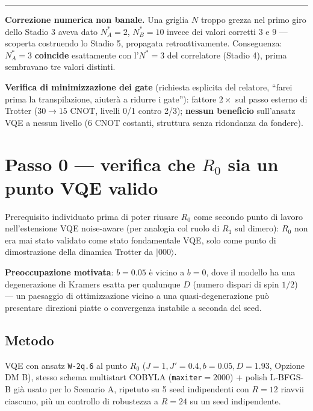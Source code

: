 \documentclass[11pt,a4paper]{article}
\begin{document}
\begin{center}
\begin{minipage}{0.93\textwidth}
\small\textcolor{arancio}{\rule{2.2em}{1.1pt}}\enspace
\textcolor{arancio}{\textbf{Correzione numerica non banale.}}\enspace
Una griglia $N$ troppo grezza nel primo giro dello Stadio 3 aveva dato
$N^*_A=2$, $N^*_B=10$ invece dei valori corretti $3$ e $9$ --- scoperta
costruendo lo Stadio 5, propagata retroattivamente. Conseguenza: $N^*_A=3$
\textbf{coincide} esattamente con l'$N^*=3$ del correlatore (Stadio 4), prima
sembravano tre valori distinti.
\end{minipage}
\end{center}
\medskip

\textbf{Verifica di minimizzazione dei gate} (richiesta esplicita del
relatore, ``farei prima la transpilazione, aiuterà a ridurre i gate''):
fattore $2\times$ sul passo esterno di Trotter ($30\to15$ CNOT, livelli 0/1
contro 2/3); \textbf{nessun beneficio} sull'ansatz VQE a nessun livello (6
CNOT costanti, struttura senza ridondanza da fondere).

\section{Passo 0 --- verifica che $R_0$ sia un punto VQE valido}

Prerequisito individuato prima di poter riusare $R_0$ come secondo punto di
lavoro nell'estensione VQE noise-aware (per analogia col ruolo di $R_1$ sul
dimero): $R_0$ non era mai stato validato come stato fondamentale VQE, solo
come punto di dimostrazione della dinamica Trotter da $|000\rangle$.

\textbf{Preoccupazione motivata}: $b=0.05$ è vicino a $b=0$, dove il modello
ha una degenerazione di Kramers esatta per qualunque $D$ (numero dispari di
spin $1/2$) --- un paesaggio di ottimizzazione vicino a una quasi-degenerazione
può presentare direzioni piatte o convergenza instabile a seconda del seed.

\subsection{Metodo}

VQE con ansatz \texttt{W-2q.6} al punto $R_0$ ($J=1,J'=0.4,b=0.05,D=1.93$,
Opzione DM B), stesso schema multistart COBYLA (\texttt{maxiter}$=2000$) +
polish L-BFGS-B già usato per lo Scenario A, ripetuto su 5 seed indipendenti
con $R=12$ riavvii ciascuno, più un controllo di robustezza a $R=24$ su un
seed indipendente.
\end{document}
